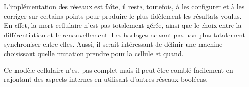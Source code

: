 \documentclass[11pt, a4paper]{article}
\begin{document}
L'implémentation des réseaux est faîte, il reste, toutefois, à les configurer
et à les corriger sur certains points pour produire le plus fidèlement les
résultats voulus. En effet, la mort cellulaire n'est pas totalement gérée,
ainsi que le choix entre la différentiation et le renouvellement. Les horloges
ne sont pas non plus totalement synchroniser entre elles. Aussi, il serait
intéressant de définir une machine choisissant quelle mutation prendre pour la
cellule et quand.

Ce modèle cellulaire n'est pas complet mais il peut être comblé facilement en
rajoutant des aspects internes en utilisant d'autres réseaux booléens.

\newpage


\end{document}
